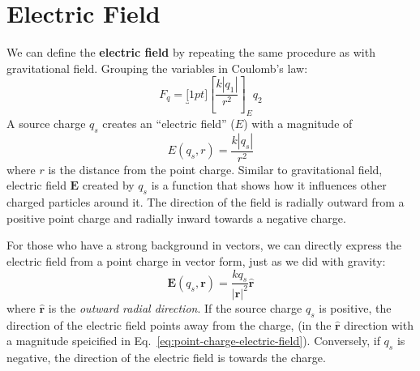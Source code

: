 \section{Electric Field}
We can define the \textbf{electric field} by repeating the same procedure as
with gravitational field. Grouping the variables in Coulomb's law:
\begin{equation}
  F_q=\underbracket[1pt]{\left[\frac{k|q_1|}{r^2}\right]}_{E}q_2
\end{equation}
A source charge $q_s$ creates an ``electric field'' ($E$) with a magnitude of
\begin{equation}
  E(q_s,r)=\frac{k|q_s|}{r^2}
  \label{eq:point-charge-electric-field}
\end{equation}
where $r$ is the distance from the point charge.
Similar to gravitational field, electric field $\bm E$ created by $q_s$ is
a function that shows how it influences other charged particles around it. The
direction of the field is radially outward from a positive point charge and
radially inward towards a negative charge.
\begin{remark}
  For those who have a strong background in vectors, we can directly express
  the electric field from a point charge in vector form, just as we did with
  gravity:
  \begin{equation*}
    \boxed{
      \bm E(q_s,\bm r)=\frac{kq_s}{|\bm r|^2}\hat{\bm r}
    }
  \end{equation*}
  where $\hat{\bm r}$ is the \emph{outward radial direction}. If the
  source charge $q_s$ is positive, the direction of the electric field points
  away from the charge, (in the $\hat{\bm r}$ direction with a magnitude
  speicified in Eq.~\ref{eq:point-charge-electric-field}). Conversely, if $q_s$
  is negative, the direction of the electric field is towards the charge.
\end{remark}

